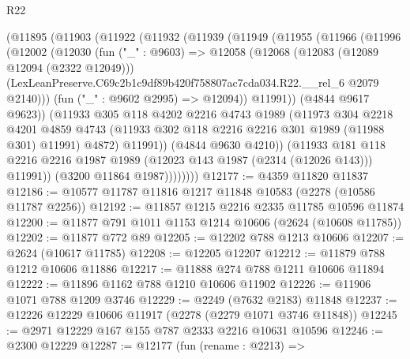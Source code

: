 \begin{lexlean}{R22}
\begin{coremodule}
          (@11895
            (@11903
              (@11922
                (@11932
                  (@11939
                    (@11949
                      (@11955
                        (@11966
                          (@11996
                            (@12002
                              (@12030
                                (fun ("_" : @9603) =>
                                @12058
                                  (@12068
                                    (@12083 (@12089 @12094 (@2322 @12049)))
                                    (LexLeanPreserve.C69c2b1c9df89b420f758807ac7cda034.R22.__rel_6
                                      @2079
                                      @2140)))
                                (fun ("_" : @9602 @2995) => @12094))
                              @11991))
                          (@4844 @9617 @9623))
                        (@11933
                          @305
                          @118
                          @4202
                          @2216
                          @4743
                          @1989
                          (@11973
                            @304
                            @2218
                            @4201
                            @4859
                            @4743
                            (@11933 @302 @118 @2216 @2216 @301 @1989 (@11988 @301) @11991)
                            @4872)
                          @11991))
                      (@4844 @9630 @4210))
                    (@11933
                      @181
                      @118
                      @2216
                      @2216
                      @1987
                      @1989
                      (@12023 @143 @1987 (@2314 (@12026 @143)))
                      @11991))
                  (@3200 @11864 @1987))))))))
@12177 := @4359 @11820 @11837
@12186 := @10577 @11787 @11816 @1217 @11848 @10583 (@2278 (@10586 @11787 @2256))
@12192 := @11857 @1215 @2216 @2335 @11785 @10596 @11874
@12200 := @11877 @791 @1011 @1153 @1214 @10606 (@2624 (@10608 @11785))
@12202 := @11877 @772 @89
@12205 := @12202 @788 @1213 @10606
@12207 := @2624 (@10617 @11785)
@12208 := @12205 @12207
@12212 := @11879 @788 @1212 @10606 @11886
@12217 := @11888 @274 @788 @1211 @10606 @11894
@12222 := @11896 @1162 @788 @1210 @10606 @11902
@12226 := @11906 @1071 @788 @1209 @3746
@12229 := @2249 (@7632 @2183) @11848
@12237 := @12226 @12229 @10606 @11917 (@2278 (@2279 @1071 @3746 @11848))
@12245 := @2971 @12229 @167 @155 @787 @2333 @2216 @10631 @10596
@12246 := @2300 @12229
@12287 := @12177
    (fun (rename : @2213) =>

\end{coremodule}
\end{lexlean}
